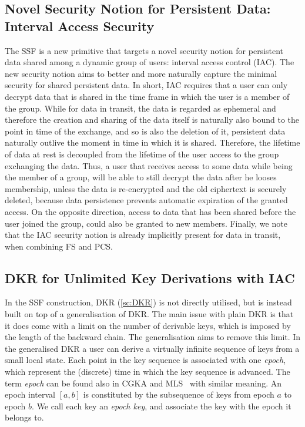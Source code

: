 \subsection{Novel Security Notion for Persistent Data: Interval Access Security}\label{sc:iac}

The SSF is a new primitive that targets a novel security 
notion for persistent data shared among a dynamic 
group of users: interval access control (IAC).
The new security notion aims to better and more naturally
capture the minimal security for shared persistent data.
In short, IAC requires that a user can only decrypt data that
is shared in the time frame in which the user is a member
of the group. While for data in transit, the data is regarded as
ephemeral and therefore the creation and sharing of the data
itself is naturally also bound to the point in time of the exchange,
and so is also the deletion of it, persistent data naturally
outlive the moment in time in which it is shared.
Therefore, the lifetime of data at rest is decoupled from the
lifetime of the user access to the group exchanging the data.
Thus, a user that receives access to some data while being the
member of a group, will be able to still decrypt the data
after he looses membership, unless the data is re-encrypted
and the old ciphertext is securely deleted, because data
persistence prevents automatic expiration of the granted access.
On the opposite direction, access to data that has been
shared before the user joined the group, could also be granted
to new members. Finally, we note that the IAC security notion
is already implicitly present for data in transit, when combining
FS and PCS.

\subsection{DKR for Unlimited Key Derivations with IAC}\label{sc:background-generalised-DKR}

In the SSF construction, DKR (\cref{sc:DKR}) is not directly utilised, 
but is instead built on top of a generalisation of DKR.
The main issue with plain DKR is that it does come with a limit
on the number of derivable keys, which is imposed by the
length of the backward chain. The generalisation aims to
remove this limit.
In the generalised DKR a user can derive a virtually infinite 
sequence of keys from a small local state.
Each point in the key sequence is associated with one \textit{epoch}, 
which represent the (discrete) time in which the key sequence is advanced.
The term \textit{epoch} can be found also in CGKA and 
MLS~\cite{rfc9420} with similar meaning.
An epoch interval $[a, b]$ is constituted by the subsequence of keys
from epoch $a$ to epoch $b$. We call each key an \textit{epoch key}, and associate
the key with the epoch it belongs to.

